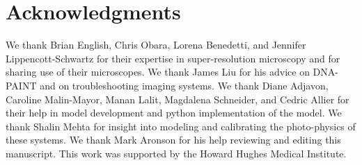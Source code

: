 \section{Acknowledgments}
We thank Brian English, Chris Obara, Lorena Benedetti, and Jennifer Lippencott-Schwartz for their expertise in
    super-resolution microscopy and for sharing use of their microscopes. 
    We thank James Liu for his advice on DNA-PAINT and on troubleshooting imaging systems.
    We thank Diane Adjavon, Caroline Malin-Mayor, Manan Lalit, Magdalena Schneider, and Cedric Allier 
    for their help in model development and python implementation of the model. 
    We thank Shalin Mehta for insight into modeling and calibrating the photo-physics of these systems.
    We thank Mark Aronson for his help reviewing and editing this manuscript. 
    This work was supported by the Howard Hughes Medical Institute. 
